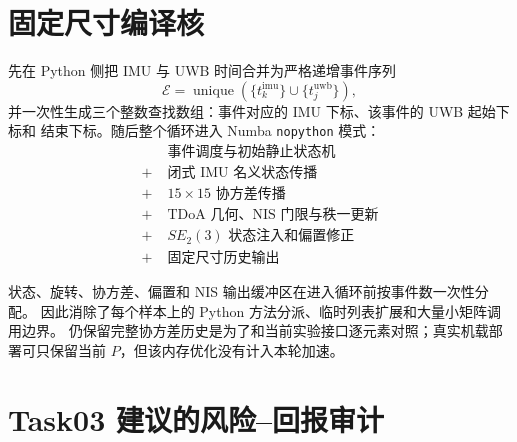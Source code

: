 \documentclass[11pt,a4paper]{ctexart}
\begin{document}
\section{固定尺寸编译核}

先在 Python 侧把 IMU 与 UWB 时间合并为严格递增事件序列
\begin{equation}
 \mathcal E=\operatorname{unique}
 (\{t_k^{\mathrm{imu}}\}\cup\{t_j^{\mathrm{uwb}}\}),
\end{equation}
并一次性生成三个整数查找数组：事件对应的 IMU 下标、该事件的 UWB 起始下标和
结束下标。随后整个循环进入 Numba \texttt{nopython} 模式：
\begin{equation}
\boxed{
\begin{aligned}
 &\text{事件调度与初始静止状态机}\\
 +\;&\text{闭式 IMU 名义状态传播}\\
 +\;&15\times15\text{ 协方差传播}\\
 +\;&\text{TDoA 几何、NIS 门限与秩一更新}\\
 +\;&SE_2(3)\text{ 状态注入和偏置修正}\\
 +\;&\text{固定尺寸历史输出}
\end{aligned}}
\end{equation}

状态、旋转、协方差、偏置和 NIS 输出缓冲区在进入循环前按事件数一次性分配。
因此消除了每个样本上的 Python 方法分派、临时列表扩展和大量小矩阵调用边界。
仍保留完整协方差历史是为了和当前实验接口逐元素对照；真实机载部署可只保留当前
$P$，但该内存优化没有计入本轮加速。

\section{Task03 建议的风险--回报审计}
\end{document}
